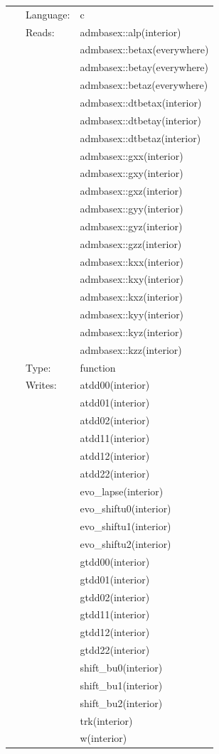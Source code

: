\documentclass{article}
\begin{document}
 \begin{tabular*}{160mm}{cll} 
~ & Language:  & c \\ 
~ & Reads:  & admbasex::alp(interior) \\ 
~& ~ &admbasex::betax(everywhere)\\ 
~& ~ &admbasex::betay(everywhere)\\ 
~& ~ &admbasex::betaz(everywhere)\\ 
~& ~ &admbasex::dtbetax(interior)\\ 
~& ~ &admbasex::dtbetay(interior)\\ 
~& ~ &admbasex::dtbetaz(interior)\\ 
~& ~ &admbasex::gxx(interior)\\ 
~& ~ &admbasex::gxy(interior)\\ 
~& ~ &admbasex::gxz(interior)\\ 
~& ~ &admbasex::gyy(interior)\\ 
~& ~ &admbasex::gyz(interior)\\ 
~& ~ &admbasex::gzz(interior)\\ 
~& ~ &admbasex::kxx(interior)\\ 
~& ~ &admbasex::kxy(interior)\\ 
~& ~ &admbasex::kxz(interior)\\ 
~& ~ &admbasex::kyy(interior)\\ 
~& ~ &admbasex::kyz(interior)\\ 
~& ~ &admbasex::kzz(interior)\\ 
~ & Type:  & function \\ 
~ & Writes:  & atdd00(interior) \\ 
~& ~ &atdd01(interior)\\ 
~& ~ &atdd02(interior)\\ 
~& ~ &atdd11(interior)\\ 
~& ~ &atdd12(interior)\\ 
~& ~ &atdd22(interior)\\ 
~& ~ &evo\_lapse(interior)\\ 
~& ~ &evo\_shiftu0(interior)\\ 
~& ~ &evo\_shiftu1(interior)\\ 
~& ~ &evo\_shiftu2(interior)\\ 
~& ~ &gtdd00(interior)\\ 
~& ~ &gtdd01(interior)\\ 
~& ~ &gtdd02(interior)\\ 
~& ~ &gtdd11(interior)\\ 
~& ~ &gtdd12(interior)\\ 
~& ~ &gtdd22(interior)\\ 
~& ~ &shift\_bu0(interior)\\ 
~& ~ &shift\_bu1(interior)\\ 
~& ~ &shift\_bu2(interior)\\ 
~& ~ &trk(interior)\\ 
~& ~ &w(interior)\\ 
\end{tabular*} 
\end{document}
